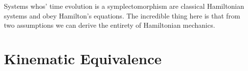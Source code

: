 \documentclass{article}
\begin{document}
	Systems whos' time evolution is a symplectomorphism are classical Hamiltonian systems and obey Hamilton's equations. The incredible thing here is that from two assumptions we can derive the entirety of Hamiltonian mechanics. 




\section{Kinematic Equivalence}
\end{document}
